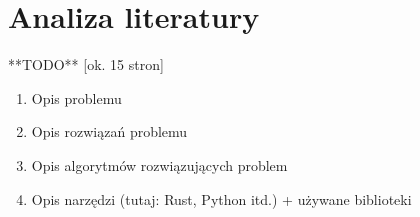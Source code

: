 \clearpage
\section{Analiza literatury}

**TODO** [ok. 15 stron]

\begin{enumerate}
    \item Opis problemu
    \item Opis rozwiązań problemu
    \item Opis algorytmów rozwiązujących problem
    \item Opis narzędzi (tutaj: Rust, Python itd.) + używane biblioteki
\end{enumerate}